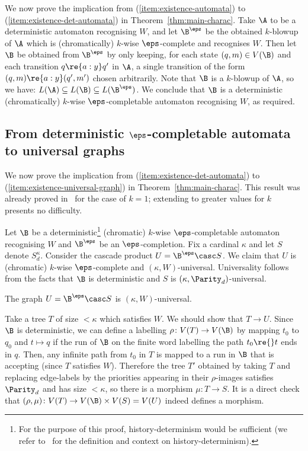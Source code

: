 We now prove the implication from (\ref{item:existence-automata}) to (\ref{item:existence-det-automata}) in Theorem~\ref{thm:main-charac}.
Take $\A$ to be a deterministic automaton recognising $W$, and let $\B^\eps$ be the obtained $k$-blowup of $\A$ which is (chromatically) $k$-wise $\eps$-complete and recognises $W$.
Then let $\B$ be obtained from $\B^\eps$ by only keeping, for each state $(q,m) \in V(\B)$ and each transition $q \re{a:y} q'$ in $\A$, a single transition of the form $(q,m) \re {a:y} (q',m')$ chosen arbitrarily.
Note that $\B$ is a $k$-blowup of $\A$, so we have: $L(\A) \subseteq L(\B) \subseteq L(\B^\eps)$.
We conclude that $\B$ is a deterministic (chromatically) $k$-wise $\eps$-completable automaton recognising $W$, as required.


\subsection{From deterministic $\eps$-completable automata to universal graphs}\label{sec:existence-universal-graphs}

We now prove the implication from (\ref{item:existence-det-automata}) to (\ref{item:existence-universal-graph}) in Theorem~\ref{thm:main-charac}.
This result was already proved in~\cite[Prop.~5.30]{CO24Arxiv} for the case of $k=1$; extending to greater values for $k$ presents no difficulty.

Let $\B$ be a deterministic\footnote{For the purpose of this proof, history-determinism would be sufficient (we refer to~\cite{BL23SurveyHD} for the definition and context on history-determinism).} (chromatic) $k$-wise $\eps$-completable automaton recognising $W$ and $\B^\eps$ be an $\eps$-completion.
Fix a cardinal $\kappa$ and let $S$ denote $S_d^\kappa$.
Consider the cascade product $U = \B^\eps \casc S$.
We claim that $U$ is (chromatic) $k$-wise $\eps$-complete and $(\kappa,W)$-universal.
Universality follows from the facts that $\B$ is deterministic and $S$ is $(\kappa,\Parity_d)$-universal.

\begin{claim}
    The graph $U = \B^\eps \casc S$ is $(\kappa,W)$-universal.
\end{claim}

\begin{claimproof}
    Take a tree $T$ of size $<\kappa$ which satisfies $W$.
    We should show that $T \to U$.
    Since $\B$ is deterministic, we can define a labelling $\rho\colon V(T) \to V(\B)$ by mapping $t_0$ to $q_0$ and $t \mapsto q$ if the run of $\B$ on the finite word labelling the path $t_0\re{}t$ ends in $q$. Then, any infinite path from $t_0$ in $T$ is mapped to a run in $\B$ that is accepting (since $T$ satisfies $W$).
    Therefore the tree $T'$ obtained by taking $T$ and replacing edge-labels by the priorities appearing in their $\rho$-images satisfies $\Parity_d$ and has size $<\kappa$, so there is a morphism $\mu:T \to S$.
    It is a direct check that $(\rho,\mu) \colon V(T) \to V(\B) \times V(S) = V(U)$ indeed defines a morphism.
\end{claimproof}

